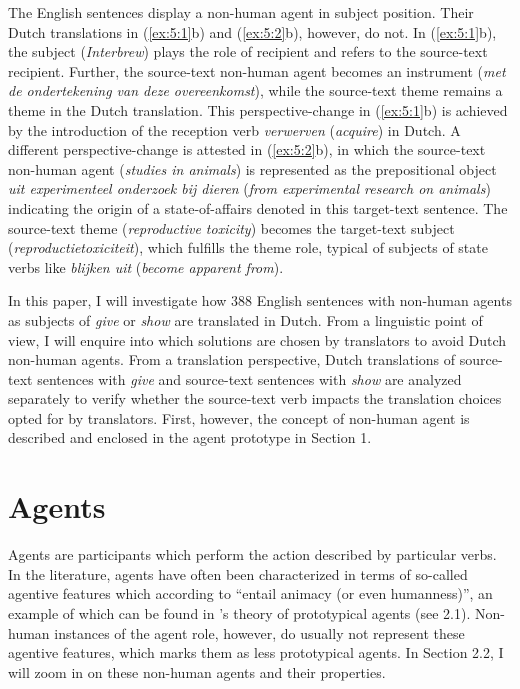 \documentclass[output=paper]{LSP/langsci}
\begin{document}

The English sentences display a non-human agent in subject position. Their Dutch translations in (\ref{ex:5:1}b) and (\ref{ex:5:2}b), however, do not. In (\ref{ex:5:1}b), the subject (\textit{Interbrew}) plays the role of recipient and refers to the source-text recipient. Further, the source-text non-human agent becomes an instrument (\textit{met de ondertekening van deze overeenkomst}), while the source-text theme remains a theme in the Dutch translation. This perspective-change in (\ref{ex:5:1}b) is achieved by the introduction of the reception verb \textit{verwerven} (\textit{acquire}) in Dutch. A different perspective-change is attested in (\ref{ex:5:2}b), in which the source-text non-human agent (\textit{studies in animals}) is represented as the prepositional object \textit{uit experimenteel onderzoek bij dieren} (\textit{from experimental research on animals}) indicating the origin of a state-of-affairs denoted in this target-text sentence. The source-text theme (\textit{reproductive toxicity}) becomes the target-text subject (\textit{reproductietoxiciteit}), which fulfills the theme role, typical of subjects of state verbs like \textit{blijken uit} (\textit{become apparent from}).

In this paper, I will investigate how 388 English sentences with non-human agents as subjects of \textit{give} or \textit{show} are translated in Dutch. From a linguistic point of view, I will enquire into which solutions are chosen by translators to avoid Dutch non-human agents. From a translation perspective, Dutch translations of source-text sentences with \textit{give} and source-text sentences with \textit{show} are analyzed separately to verify whether the source-text verb impacts the translation choices opted for by translators. First, however, the concept of non-human agent is described and enclosed in the agent prototype in Section 1. 

\section{Agents} 

Agents are participants which perform the action described by particular verbs. In the literature, agents have often been characterized in terms of so-called agentive features which according to \citet[49]{Hundt2004} “entail animacy (or even humanness)”, an example of which can be found in \citeauthor{Dowty1991}'s \citeyear{Dowty1991} theory of prototypical agents (see 2.1). Non-human instances of the agent role, however, do usually not represent these agentive features, which marks them as less prototypical agents. In Section 2.2, I will zoom in on these non-human agents and their properties. 
\end{document}
